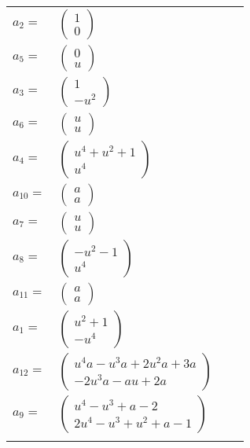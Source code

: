 \documentclass[1p]{elsarticle_modified}
\theoremstyle{definition}
\begin{document}
\begin{tabular}{m{7pt} m{180pt} m{7pt} m{180pt} }
\flushright $a_{2}=$&$\begin{pmatrix}1\\0\end{pmatrix}$ \\
\flushright $a_{5}=$&$\begin{pmatrix}0\\u\end{pmatrix}$ \\
\flushright $a_{3}=$&$\begin{pmatrix}1\\- u^2\end{pmatrix}$ \\
\flushright $a_{6}=$&$\begin{pmatrix}u\\u\end{pmatrix}$ \\
\flushright $a_{4}=$&$\begin{pmatrix}u^4+u^2+1\\u^4\end{pmatrix}$ \\
\flushright $a_{10}=$&$\begin{pmatrix}a\\a\end{pmatrix}$ \\
\flushright $a_{7}=$&$\begin{pmatrix}u\\u\end{pmatrix}$ \\
\flushright $a_{8}=$&$\begin{pmatrix}- u^2-1\\u^4\end{pmatrix}$ \\
\flushright $a_{11}=$&$\begin{pmatrix}a\\a\end{pmatrix}$ \\
\flushright $a_{1}=$&$\begin{pmatrix}u^2+1\\- u^4\end{pmatrix}$ \\
\flushright $a_{12}=$&$\begin{pmatrix}u^4 a- u^3 a+2 u^2 a+3 a\\-2 u^3 a- a u+2 a\end{pmatrix}$ \\
\flushright $a_{9}=$&$\begin{pmatrix}u^4- u^3+a-2\\2 u^4- u^3+u^2+a-1\end{pmatrix}$\\&\end{tabular}
\end{document}
